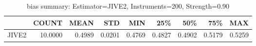 \begin{table}[ht]
\centering
\caption{bias summary: Estimator=JIVE2, Instruments=200, Strength=0.90}
\begin{tabular}{lrrrrrrrr}
\toprule
 & COUNT & MEAN & STD & MIN & 25\% & 50\% & 75\% & MAX \\
\midrule
JIVE2 & 10.0000 & 0.4989 & 0.0201 & 0.4769 & 0.4827 & 0.4902 & 0.5179 & 0.5259 \\
\bottomrule
\end{tabular}
\end{table}
